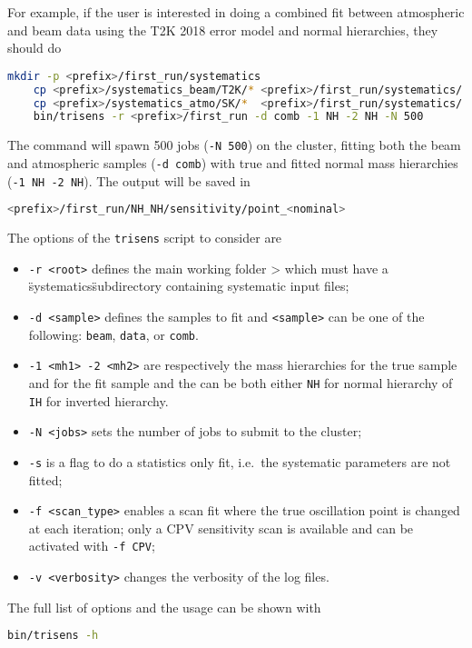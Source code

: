 \documentclass[a4paper, 11pt]{article}
\begin{document}
For example, if the user is interested in doing a combined fit between atmospheric and beam data %
using the T2K 2018 error model and normal hierarchies, they should do
\begin{lstlisting}[language=bash]
    mkdir -p <prefix>/first_run/systematics
    cp <prefix>/systematics_beam/T2K/* <prefix>/first_run/systematics/
    cp <prefix>/systematics_atmo/SK/*  <prefix>/first_run/systematics/
    bin/trisens -r <prefix>/first_run -d comb -1 NH -2 NH -N 500
\end{lstlisting}
The command will spawn 500 jobs (\texttt{-N 500}) on the cluster, %
fitting both the beam and atmospheric samples %
(\texttt{-d comb}) with true and fitted normal mass hierarchies (\texttt{-1 NH -2 NH}).
The output will be saved in
\begin{lstlisting}[language=bash]
    <prefix>/first_run/NH_NH/sensitivity/point_<nominal>
\end{lstlisting}
The options of the \texttt{trisens} script to consider are
\begin{itemize}
	\small
	\item \texttt{-r <root>} defines the main working folder > which must have a \"systematics\"
		subdirectory containing systematic input files;
	\item \texttt{-d <sample>} defines the samples to fit and \texttt{<sample>} can be one of
		the following: \texttt{beam}, \texttt{data}, or \texttt{comb}.
	\item \texttt{-1 <mh1> -2 <mh2>} are respectively the mass hierarchies for the %
		true sample and for the fit sample and the can be both either \texttt{NH} %
		for normal hierarchy of \texttt{IH} for inverted hierarchy.
	\item \texttt{-N <jobs>} sets the number of jobs to submit to the cluster;
	\item \texttt{-s} is a flag to do a statistics only fit, i.e.\ the systematic parameters are not fitted;
	\item \texttt{-f <scan\_type>} enables a scan fit where the true oscillation point %
		is changed at each iteration; only a CPV sensitivity scan is available and %
		can be activated with \texttt{-f CPV};
	\item \texttt{-v <verbosity>} changes the verbosity of the log files.
\end{itemize}
The full list of options and the usage can be shown with
\begin{lstlisting}[language=bash]
    bin/trisens -h
\end{lstlisting}
\end{document}
